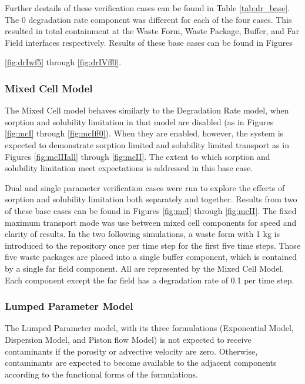 Further destails of these verification 
cases can be found in Table \ref{tab:dr_base}. The 0 degradation rate component was 
different for each of the four cases. This resulted in total containment at the 
Waste Form, Waste Package, Buffer, and Far Field interfaces respectively. 
Results of these base cases can be found in Figures 

\ref{fig:drIwf5} through \ref{fig:drIVff0}.
\FloatBarrier


\FloatBarrier

\subsubsection{Mixed Cell Model}
The Mixed Cell model behaves similarly to the Degradation Rate model, when 
sorption and solubility limitation in that model are disabled (as in Figures 
\ref{fig:mcI} through \ref{fig:mcIff0}). When they are enabled, however, the 
system is expected to demonstrate sorption limited and solubility limited 
transport as in Figures \ref{fig:mcIIIall} through \ref{fig:mcII}. The extent 
to which sorption and solubility limitation meet expectations is addressed in 
this base case.  

Dual and single parameter verification cases were run to explore the effects of 
sorption and solubility limitation both separately and together.  Results from 
two of these base cases can be found in Figures \ref{fig:mcI} through 
\ref{fig:mcII}.
The fixed maximum transport mode was use between mixed cell components for speed 
and clarity of results.
In the two following simulations, a waste form with 1 kg is introduced to the repository once 
per time step for the first five time steps. Those five waste packages are 
placed into a single buffer component, which is contained by a single far field 
component. All are represented by the Mixed Cell Model. Each component except 
the far field has a degradation rate of 0.1 per time step.


\FloatBarrier

\subsubsection{Lumped Parameter Model}
The Lumped Parameter model, with its three formulations (Exponential Model, 
Dispersion Model, and Piston flow Model) is not expected to receive 
contaminants if the porosity or advective velocity are zero. Otherwise, 
contaminants are expected to  become available to the adjacent components 
according to the functional forms of the formulations. 

